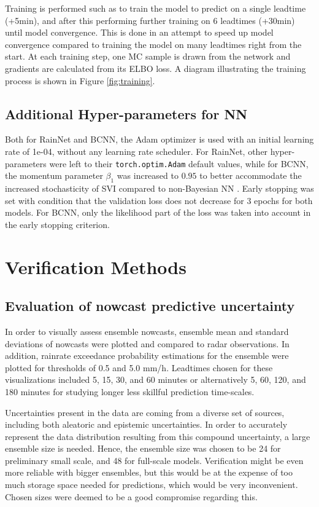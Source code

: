 Training is performed such as to train the model to predict on a single leadtime (+5min), and after this performing further training on 6 leadtimes (+30min) until model convergence. This is done in an attempt to speed up model convergence compared to training the model on many leadtimes right from the start. At each training step, one MC sample is drawn from the network and gradients are calculated from its ELBO loss. A diagram illustrating the training process is shown in Figure \ref{fig:training}.

\subsection{Additional Hyper-parameters for NN}
\label{section:hyper}
 Both for RainNet and BCNN, the Adam optimizer is used with an initial learning rate of 1e-04, without any learning rate scheduler. For RainNet, other hyper-parameters were left to their \texttt{torch.optim.Adam} default values, while for BCNN, the momentum parameter $\beta_1$ was increased to $0.95$ to better accommodate the increased stochasticity of SVI compared to non-Bayesian NN \cite{noauthor_svi_nodate}. Early stopping was set with condition that the validation loss does not decrease for 3 epochs for both models. For BCNN, only the likelihood part of the loss was taken into account in the early stopping criterion. 


\section{Verification Methods}


\subsection{Evaluation of nowcast predictive uncertainty}


In order to visually assess ensemble nowcasts, ensemble mean and standard deviations of nowcasts were plotted and compared to radar observations. In addition, rainrate exceedance probability estimations for the ensemble were plotted for thresholds of 0.5 and 5.0 mm/h. Leadtimes chosen for these visualizations included 5, 15, 30, and 60 minutes or alternatively 5, 60, 120, and 180 minutes for studying longer less skillful prediction time-scales.

Uncertainties present in the data are coming from a diverse set of sources, including both aleatoric and epistemic uncertainties. In order to accurately represent the data distribution resulting from this compound uncertainty, a large ensemble size is needed. Hence, the ensemble size was chosen to be 24 for preliminary small scale, and 48 for full-scale models. Verification might be even more reliable with bigger ensembles, but this would be at the expense of too much storage space needed for predictions, which would be very inconvenient. Chosen sizes were deemed to be a good compromise regarding this.



